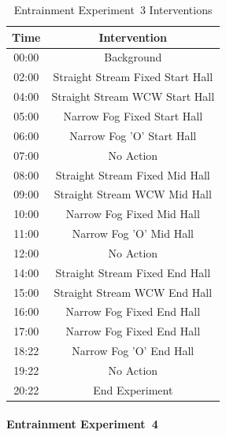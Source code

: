\documentclass[12pt,oneside]{book}
\begin{document}
\begin{table}[H]
	\centering
	\caption{Entrainment Experiment~3 Interventions}
	\begin{tabular}{|c|c|} 
		\hline
		Time 	& 	Intervention 	\\ \hline \hline
		00:00 	&	Background 	\\ \hline
		02:00 	&	Straight Stream Fixed Start Hall 	\\ \hline
		04:00 	&	Straight Stream WCW Start Hall 	\\ \hline
		05:00 	&	Narrow Fog Fixed Start Hall 	\\ \hline
		06:00 	&	Narrow Fog 'O' Start Hall 	\\ \hline
		07:00 	&	No Action 	\\ \hline
		08:00 	&	Straight Stream Fixed Mid Hall 	\\ \hline
		09:00 	&	Straight Stream WCW Mid Hall 	\\ \hline
		10:00 	&	Narrow Fog Fixed Mid Hall 	\\ \hline
		11:00 	&	Narrow Fog 'O' Mid Hall 	\\ \hline
		12:00 	&	No Action 	\\ \hline
		14:00 	&	Straight Stream Fixed End Hall 	\\ \hline
		15:00 	&	Straight Stream WCW End Hall 	\\ \hline
		16:00 	&	Narrow Fog Fixed End Hall 	\\ \hline
		17:00 	&	Narrow Fog Fixed End Hall 	\\ \hline
		18:22 	&	Narrow Fog 'O' End Hall 	\\ \hline
		19:22 	&	No Action 	\\ \hline
		20:22 	&	End Experiment 	\\ \hline
	\end{tabular}
	\label{Table:EntExp3_Interventions}
\end{table}

\FloatBarrier

\paragraph{Entrainment Experiment~4} \mbox{}

\end{document}
